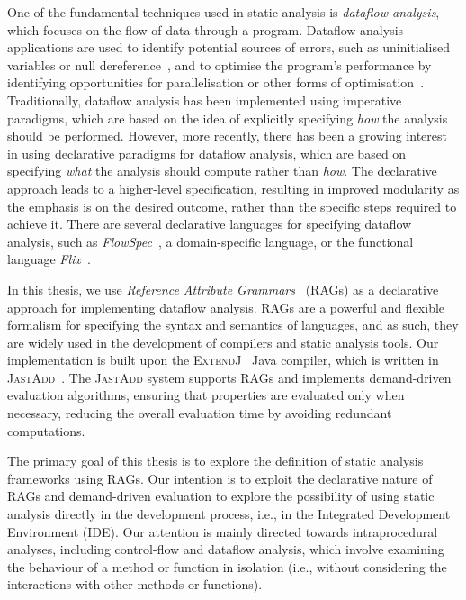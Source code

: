 One of the fundamental techniques used in static analysis is \emph{dataflow analysis},
which focuses on the flow of data through a program. Dataflow analysis applications are used to identify
potential sources of errors, such as uninitialised variables or null dereference~\cite{khedker2017data},
and to optimise the program's performance by identifying opportunities for
parallelisation or other forms of optimisation~\cite{aho2007compilers}.
Traditionally, dataflow analysis has been implemented using imperative paradigms,
which are based on the idea of explicitly specifying \emph{how} the analysis should be
performed.
However, more recently, there has been a growing interest in using
declarative paradigms for dataflow analysis, which are based on specifying \emph{what}
the analysis should compute rather than \emph{how}.
The declarative approach leads to a higher-level specification, resulting in improved modularity as
the emphasis is on the desired outcome, rather than the specific steps required to
achieve it.
There are several declarative languages for specifying dataflow analysis,
such as \emph{FlowSpec}~\cite{smits2020flowspec}, a domain-specific language,
or the functional language \emph{Flix}~\cite{madsen2016programming}.

In this thesis, we use \emph{Reference Attribute Grammars}~\cite{hedin2000rags} (RAGs)
as a declarative approach for implementing dataflow analysis. RAGs are
a powerful and flexible formalism for specifying the syntax and semantics of languages,
and as such, they are widely used in the development of compilers and static analysis tools.
Our implementation is built upon the \textsc{ExtendJ}~\cite{DBLP:conf/oopsla/EkmanH07} Java compiler,
which is written in \textsc{JastAdd}~\cite{DBLP:journals/entcs/HedinM01}.
The \textsc{JastAdd} system supports RAGs and implements demand-driven evaluation algorithms,
ensuring that properties are evaluated only
when necessary, reducing the overall evaluation time by avoiding redundant
computations.

The primary goal of this thesis is to explore the definition of static analysis
frameworks using RAGs.
Our intention is to exploit the declarative nature of RAGs and
demand-driven evaluation to explore the possibility of using static
analysis directly in the development process, i.e., in the Integrated Development Environment (IDE).
Our attention is mainly directed towards intraprocedural analyses,
including control-flow and dataflow analysis, which involve examining the
behaviour of a method or function in isolation (i.e., without considering the
interactions with other methods or functions).


